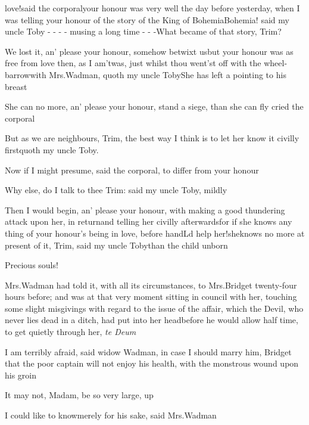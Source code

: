\documentclass[twoside]{article}
\begin{document}
 love!\tsh said the
corporal\tsk your honour was very well the day before yesterday,
when I was telling your honour of the story of the King of
Bohemia\break\null\tsk Bohemia! said my uncle Toby - - - -\break
musing a long time - - -\enspace What became of that story,
Trim?

\tsh We lost it, an’ please your honour, somehow betwixt
us\tsk but your honour was as free from love then, as I
am\tsh\break ’twas, just whilst thou went’st off with
the wheel-barrow\tsh with Mrs.\@ Wadman, quoth my
uncle Toby\tsh She has left a
 pointing to his breast\tsh

\tsh She can no more, an’ please your\break
honour, stand a siege, than she can fly\tsk\break
cried the corporal\tsh

\tsh But as we are neighbours, Trim,\break
\tsk the
best way I think is to let her know it civilly first\tsk quoth my
uncle Toby.

Now if I might presume, said the corporal, to differ from your
honour\tsh

\tsh Why else, do I talk to thee Trim: said my uncle
Toby, mildly\tsh

\tsh Then I would begin, an’ please your honour, with
making a good thundering attack upon her, in return\tsk and
telling her civilly afterwards\tsk for if she knows any thing of
your honour’s being in love, before
hand\tsh L\tsk d help her!\tsk she\break knows no more at
present of it, Trim, said my uncle Toby\tsk than
the child\break
unborn\tsh

Precious souls!\tsh

Mrs.\@ Wadman had told it, with all its circumstances, to
Mrs.\@ Bridget twenty-four hours before; and was at that very\break
moment sitting in council with her, touching some slight misgivings
with regard to the issue of the affair, which the Devil, who never
lies dead in a ditch, had put into her head\tsk before he would
allow half time, to get quietly through her, \textit{te Deum}\tsh

I am terribly afraid, said widow Wadman, in case I should
marry him, Bridget
\tsk that the poor captain will not enjoy his
health, with the monstrous wound upon his groin\tsh

It may not, Madam, be so very large, 
up\tsh

\tsh I could like to know\tsk merely for his sake,
said Mrs.\@ Wadman\tsh
\end{document}
